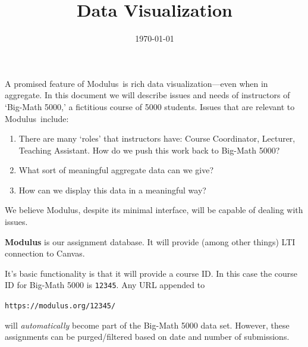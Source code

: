 \documentclass{techbrief}
\title{Data\! Visualization}
\date{\today}
\newcommand{\modulus}{\textsf{Modulus}}
\begin{document}
\pagestyle{main}%
\thispagestyle{title}
\lettrine[lines=2]{A}{} promised feature of \modulus\ is rich data
visualization---even when in
aggregate.
In this document we will describe issues and needs of instructors of `Big-Math
5000,' a fictitious course of 5000 students.
Issues that are relevant to \modulus\ include:
\begin{enumerate}
    \item There are many `roles' that instructors have: Course Coordinator,
          Lecturer, Teaching Assistant. How do we push this work back to
          Big-Math 5000?
    \item What sort of meaningful aggregate data can we give?
    \item How can we display this data in a meaningful way?
\end{enumerate}

We believe \modulus, despite its minimal interface, will be capable of dealing
with issues.

\begin{xframe}{\bfseries \modulus} is our assignment database. It will provide (among other things) LTI connection to Canvas.

    \begin{center}
    \end{center}

    
    It's basic functionality is that it will provide a course ID. In this case the course ID for Big-Math 5000 is \texttt{12345}.
    Any URL appended to
    \begin{center}
        \texttt{https://modulus.org/12345/}
    \end{center}
    will \textit{automatically} become part of the Big-Math 5000 data set. However, these assignments can be purged/filtered based on date and number of submissions. 
\end{xframe}
\end{document}
